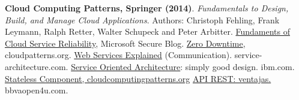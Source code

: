 \begin{thebibliography}{1}
\textbf{Cloud Computing Patterns, Springer (2014)}. \textit{Fundamentals to Design, Build, and Manage Cloud Applications}. Authors: Christoph Fehling, Frank Leymann, Ralph Retter, Walter Schupeck and Peter Arbitter.
\href{https://blogs.microsoft.com/microsoftsecure/2012/09/12/fundamentals-of-cloud-service-reliability/}{Fundaments of Cloud Service Reliability}, Microsoft Secure Blog.
\href{http://cloudpatterns.org/design_patterns/zero_downtime}{Zero Downtime}, cloudpatterns.org.
\href{http://www.service-architecture.com/articles/web-services/web_services_explained.html}{Web Services Explained} (Communication). service-architecture.com.
\href{https://www-01.ibm.com/software/solutions/soa/}{Service Oriented Architecture}: simply good design. ibm.com.
\href{http://www.cloudcomputingpatterns.org/stateless_component/}{Stateless Component, cloudcomputingpatterns.org}
\href{https://bbvaopen4u.com/es/actualidad/api-rest-que-es-y-cuales-son-sus-ventajas-en-el-desarrollo-de-proyectos}{API REST: ventajas.}  bbvaopen4u.com.
\end{thebibliography}

